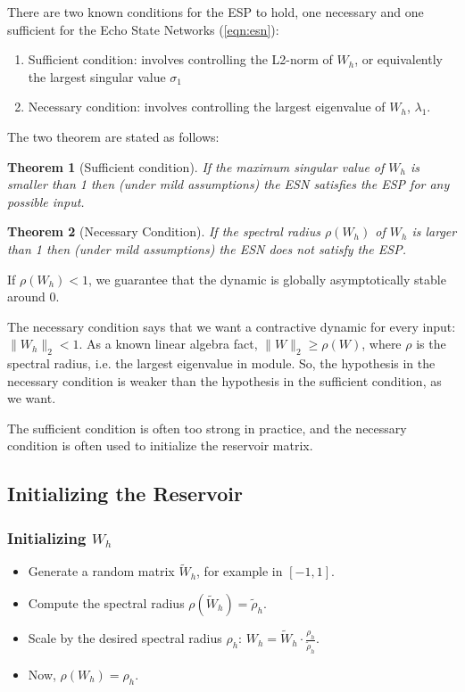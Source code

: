\documentclass[oneside]{book}
\theoremstyle{definition}
\theoremstyle{plain}
\newtheorem{teo}{Theorem}
\begin{document}
There are two known conditions for the ESP to hold, one necessary and one sufficient for the Echo State Networks (\ref{eqn:esn}):
\begin{enumerate}
    \item Sufficient condition:  involves controlling the L2-norm of $W_h$, or equivalently the largest singular value $\sigma_1$
    \item Necessary condition: involves controlling the largest eigenvalue of $W_h$, $\lambda_1$.



\end{enumerate}

The two theorem are stated as follows:
\begin{teo}[Sufficient condition]\label{teo:esn-suff}
    If the maximum singular value of  $W_h$ is smaller than 1 then (under mild assumptions) the ESN satisfies the ESP for any possible input.  
\end{teo}
\begin{teo}[Necessary Condition]\label{teo:esn-nec}
   If the spectral radius  $\rho(W_h)$ of $W_h$ is larger than 1 then (under mild assumptions) the ESN does not satisfy the ESP. 
\end{teo}
If $\rho(W_h)<1$, we guarantee that the dynamic is globally asymptotically stable around $0$.

The necessary condition says that we want a contractive dynamic for every input: $\|W_h\|_2<1$.
As a known linear algebra fact, $\|W\|_2\geq \rho(W)$, where $\rho$ is the spectral radius, i.e. the largest eigenvalue in module. So, the hypothesis in the necessary condition is weaker than the hypothesis in the sufficient condition, as we want.

The sufficient condition is often too strong in practice, and the necessary condition is often used to initialize the reservoir matrix.

\subsection{Initializing the Reservoir}
\subsubsection{Initializing $W_h$}
\begin{itemize}
    \item Generate a random matrix $\tilde{W}_h$, for example in $[-1, 1]$.
    \item Compute the spectral radius $\rho(\tilde{W}_h)=\tilde{\rho}_h$.
    \item Scale by the desired spectral radius $\rho_h$: $W_h =\tilde{W}_h\cdot \frac{\rho_h}{\tilde{\rho}_h}$.
    \item Now, $\rho(W_h)=\rho_h$.
\end{itemize}
\end{document}
